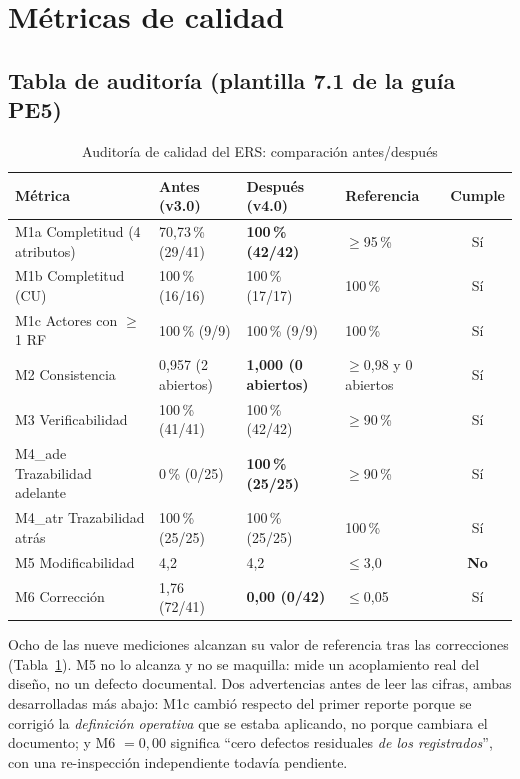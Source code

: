 \section{M\'etricas de calidad}

\subsection{Tabla de auditor\'ia (plantilla 7.1 de la gu\'ia PE5)}

\begin{table}[H]
\centering
\small
\begin{tabular}{|p{4.2cm}|p{3.2cm}|p{2.9cm}|p{2.3cm}|c|}
\hline
\textbf{M\'etrica} & \textbf{Antes (v3.0)} & \textbf{Despu\'es (v4.0)} & \textbf{Referencia} & \textbf{Cumple} \\ \hline
M1a Completitud (4 atributos) & 70,73\,\% (29/41) & \textbf{100\,\% (42/42)} & $\geq$95\,\% & S\'i \\ \hline
M1b Completitud (CU) & 100\,\% (16/16) & 100\,\% (17/17) & 100\,\% & S\'i \\ \hline
M1c Actores con $\geq$1 RF & 100\,\% (9/9) & 100\,\% (9/9) & 100\,\% & S\'i \\ \hline
M2 Consistencia & 0,957 (2 abiertos) & \textbf{1,000 (0 abiertos)} & $\geq$0,98 y 0 abiertos & S\'i \\ \hline
M3 Verificabilidad & 100\,\% (41/41) & 100\,\% (42/42) & $\geq$90\,\% & S\'i \\ \hline
M4\_ade Trazabilidad adelante & 0\,\% (0/25) & \textbf{100\,\% (25/25)} & $\geq$90\,\% & S\'i \\ \hline
M4\_atr Trazabilidad atr\'as & 100\,\% (25/25) & 100\,\% (25/25) & 100\,\% & S\'i \\ \hline
M5 Modificabilidad & 4,2 & 4,2 & $\leq$3,0 & \textbf{No} \\ \hline
M6 Correcci\'on & 1,76 (72/41) & \textbf{0,00 (0/42)} & $\leq$0,05 & S\'i \\ \hline
\end{tabular}
\caption{Auditor\'ia de calidad del ERS: comparaci\'on antes/despu\'es}
\label{tab:auditoria-08}
\end{table}

Ocho de las nueve mediciones alcanzan su valor de referencia tras las correcciones (Tabla~\ref{tab:auditoria-08}). M5 no lo alcanza y no se maquilla: mide un acoplamiento real del dise\~no, no un defecto documental. Dos advertencias antes de leer las cifras, ambas desarrolladas m\'as abajo: M1c cambi\'o respecto del primer reporte porque se corrigi\'o la \emph{definici\'on operativa} que se estaba aplicando, no porque cambiara el documento; y M6 $=0{,}00$ significa ``cero defectos residuales \emph{de los registrados}'', con una re-inspecci\'on independiente todav\'ia pendiente.

